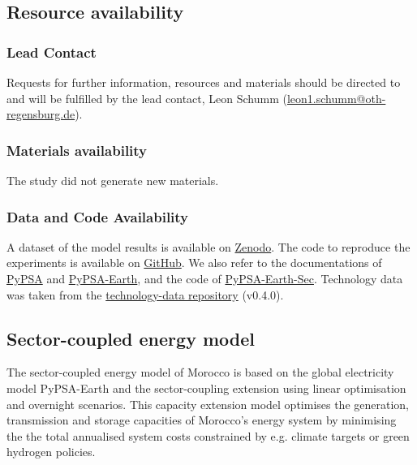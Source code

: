 

\subsection*{Resource availability}

\subsubsection*{Lead Contact}

Requests for further information, resources and materials should be directed to and will be fulfilled by the lead contact, Leon Schumm
(\href{mailto:leon1.schumm@oth-regensburg.de}{leon1.schumm@oth-regensburg.de}).

\subsubsection*{Materials availability}
The study did not generate new materials.



\subsubsection*{Data and Code Availability}

A dataset of the model results is available on \href{https://doi.org/10.5281/zenodo.10951650}{Zenodo}. The code to reproduce the experiments is available on \href{https://github.com/energyLS/aldehyde}{GitHub}.
We also refer to the documentations of \href{https://pypsa.readthedocs.io}{PyPSA} and  \href{https://pypsa-earth.readthedocs.io}{PyPSA-Earth}, and the code of 
\href{https://github.com/pypsa-meets-earth/pypsa-earth-sec}{PyPSA-Earth-Sec}.
Technology data was taken from the
\href{https://github.com/pypsa/technology-data}{technology-data repository} (v0.4.0).




\subsection*{Sector-coupled energy model}
\label{subsec:moroccan_model}
The sector-coupled energy model of Morocco is based on the global electricity model  PyPSA-Earth \cite{Parzen2023} and the sector-coupling extension \cite{Abdel-Khalek2024} using linear optimisation and overnight scenarios. This capacity extension model optimises the generation, transmission and storage capacities of Morocco's energy system by minimising the the total annualised system costs constrained by e.g. climate targets or green hydrogen policies.

